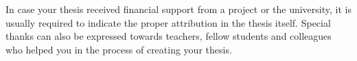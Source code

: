 \documentclass[
]{elteikthesis}[2024/04/10]
\begin{document}
\cleardoublepage


\cleardoublepage


\cleardoublepage


\cleardoublepage

\chapter*{\acklabel}
In case your thesis received financial support from a project or the university, it is usually required to indicate the proper attribution in the thesis itself. Special thanks can also be expressed towards teachers, fellow students and colleagues who helped you in the process of creating your thesis.

\appendix

\cleardoublepage

{}
\printbibliography[title=\biblabel]
\cleardoublepage

{}
\listoffigures
\cleardoublepage

{}
\listoftables
\cleardoublepage

{}
\listofalgorithms
\cleardoublepage

{}
\lstlistoflistings
\cleardoublepage

\end{document}
